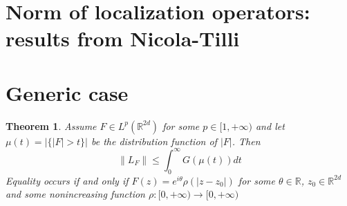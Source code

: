 \documentclass[corpo=11pt, stile=classica, tipotesi=custom,
greek, evenboxes, english]{toptesi}
\numberwithin{equation}{chapter}
\newtheorem{teo}{Theorem}[chapter] %
\newcommand{\R}{\mathbb{R}} %
\begin{document}
\section{Norm of localization operators: results from Nicola-Tilli}\label{section norm of localization operators}
\section{Generic case}
\begin{teo}\label{norm limitation}
	Assume $F \in L^p(\R^{2d})$ for some $p \in [1,+\infty)$ and let $\mu(t) = |\{|F|>t\}|$ be the distribution function of $|F|$. Then
	\begin{equation}\label{norm limitation formula}
		\| L_F \| \leq \int_0^{\infty} G(\mu(t))dt
	\end{equation}
	Equality occurs if and only if $F(z)=e^{i\theta}\rho(|z-z_0|)$ for some $\theta \in \R$, $z_0 \in \R^{2d}$ and some nonincreasing function $\rho : [0,+\infty) \rightarrow [0,+\infty)$
\end{teo}
\end{document}
